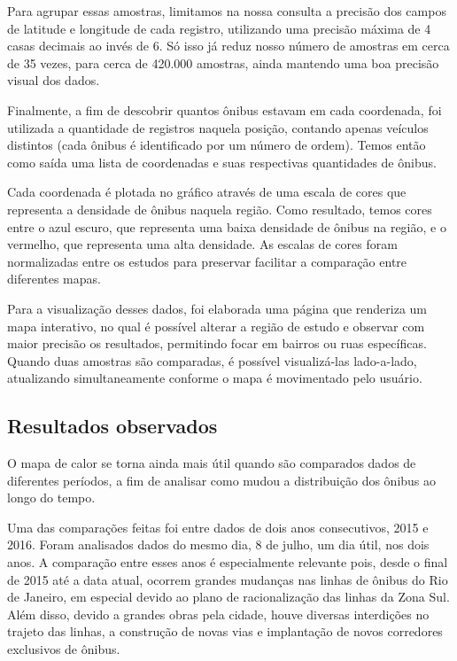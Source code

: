 Para agrupar essas amostras, limitamos na nossa consulta a precisão dos campos de latitude e longitude de cada registro, utilizando uma precisão máxima de 4 casas decimais ao invés de 6. Só isso já reduz nosso número de amostras em cerca de 35 vezes, para cerca de 420.000 amostras, ainda mantendo uma boa precisão visual dos dados. 

Finalmente, a fim de descobrir quantos ônibus estavam em cada coordenada, foi utilizada a quantidade de registros naquela posição, contando apenas veículos distintos (cada ônibus é identificado por um número de ordem). Temos então como saída uma lista de coordenadas e suas respectivas quantidades de ônibus. 

Cada coordenada é plotada no gráfico através de uma escala de cores que representa a densidade de ônibus naquela região\cite{heatmap}. Como resultado, temos cores entre o azul escuro, que representa uma baixa densidade de ônibus na região, e o vermelho, que representa uma alta densidade. As escalas de cores foram normalizadas entre os estudos para preservar facilitar a comparação entre diferentes mapas.

Para a visualização desses dados, foi elaborada uma página que renderiza um mapa interativo, no qual é possível alterar a região de estudo e observar com maior precisão os resultados, permitindo focar em bairros ou ruas específicas. Quando duas amostras são comparadas, é possível visualizá-las lado-a-lado, atualizando simultaneamente conforme o mapa é movimentado pelo usuário.


\subsection{Resultados observados}

O mapa de calor se torna ainda mais útil quando são comparados dados de diferentes períodos, a fim de analisar como mudou a distribuição dos ônibus ao longo do tempo.

Uma das comparações feitas foi entre dados de dois anos consecutivos, 2015 e 2016. Foram analisados dados do mesmo dia, 8 de julho, um dia útil, nos dois anos. A comparação entre esses anos é especialmente relevante pois, desde o final de 2015 até a data atual, ocorrem grandes mudanças nas linhas de ônibus do Rio de Janeiro, em especial devido ao plano de racionalização das linhas da Zona Sul\cite{noticia_racionalizacao}. Além disso, devido a grandes obras pela cidade, houve diversas interdições no trajeto das linhas, a construção de novas vias e implantação de novos corredores exclusivos de ônibus.

